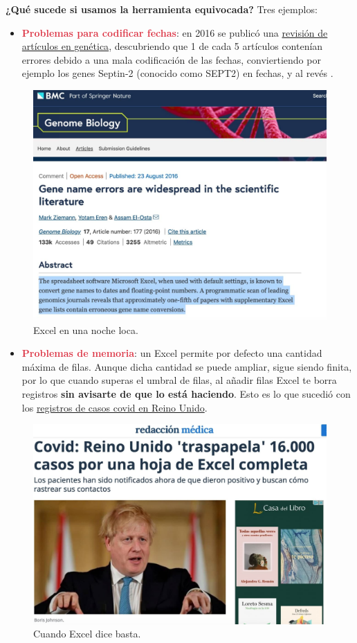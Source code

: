 \documentclass[11pt,]{book}
\providecommand{\tightlist}{%
  \setlength{\itemsep}{0pt}\setlength{\parskip}{0pt}}
\begin{document}
\textbf{¿Qué sucede si usamos la herramienta equivocada?} Tres ejemplos:

\begin{itemize}
\tightlist
\item
  \textbf{\textcolor{#dc3545}{Problemas para codificar fechas}}: en 2016 se publicó una \href{https://genomebiology.biomedcentral.com/articles/10.1186/s13059-016-1044-7}{revisión de artículos en genética}, descubriendo que 1 de cada 5 artículos contenían errores debido a una mala codificación de las fechas, conviertiendo por ejemplo los genes Septin-2 (conocido como SEPT2) en fechas, y al revés \citep{Ziemannetal16}.
\end{itemize}

\begin{figure}

{\centering \includegraphics[width=0.5\linewidth]{./img/excel_genes} 

}

\caption{Excel en una noche loca.}\label{fig:excel-genes}
\end{figure}

\begin{itemize}
\tightlist
\item
  \textbf{\textcolor{#dc3545}{Problemas de memoria}}: un Excel permite por defecto una cantidad máxima de filas. Aunque dicha cantidad se puede ampliar, sigue siendo finita, por lo que cuando superas el umbral de filas, al añadir filas Excel te borra registros \textbf{sin avisarte de que lo está haciendo}. Esto es lo que sucedió con los \href{https://www.redaccionmedica.com/secciones/sanidad-hoy/covid-reino-unido-pierden-16000-positivos-9989}{registros de casos covid en Reino Unido}.
\end{itemize}

\begin{figure}

{\centering \includegraphics[width=0.5\linewidth]{./img/excel_uk} 

}

\caption{Cuando Excel dice basta.}\label{fig:excel-uk}
\end{figure}
\end{document}
